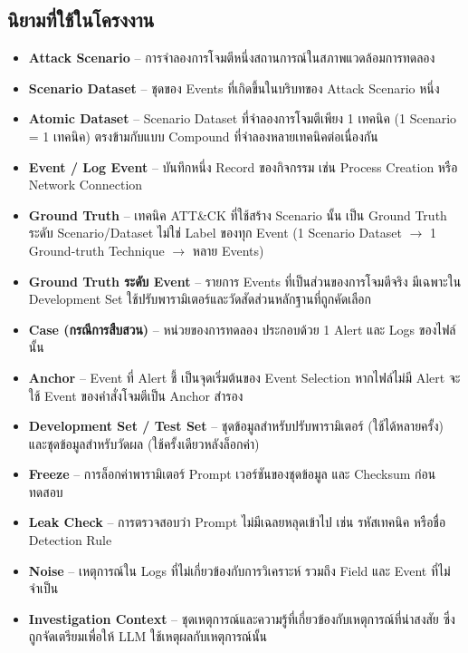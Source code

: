\subsection{นิยามที่ใช้ในโครงงาน}
\label{sec:scenario-def}
\begin{itemize}
  \item \textbf{Attack Scenario} -- การจำลองการโจมตีหนึ่งสถานการณ์ในสภาพแวดล้อมการทดลอง
  \item \textbf{Scenario Dataset} -- ชุดของ Events ที่เกิดขึ้นในบริบทของ Attack Scenario หนึ่ง
  \item \textbf{Atomic Dataset} -- Scenario Dataset ที่จำลองการโจมตีเพียง 1 เทคนิค
      (1 Scenario = 1 เทคนิค) ตรงข้ามกับแบบ Compound ที่จำลองหลายเทคนิคต่อเนื่องกัน
  \item \textbf{Event / Log Event} -- บันทึกหนึ่ง Record ของกิจกรรม เช่น Process Creation หรือ Network Connection
  \item \textbf{Ground Truth} -- เทคนิค ATT\&CK ที่ใช้สร้าง Scenario นั้น
        เป็น Ground Truth ระดับ Scenario/Dataset ไม่ใช่ Label ของทุก Event
        (1 Scenario Dataset $\rightarrow$ 1 Ground-truth Technique $\rightarrow$ หลาย Events)
  \item \textbf{Ground Truth ระดับ Event} -- รายการ Events ที่เป็นส่วนของการโจมตีจริง
        มีเฉพาะใน Development Set ใช้ปรับพารามิเตอร์และวัดสัดส่วนหลักฐานที่ถูกคัดเลือก
  \item \textbf{Case (กรณีการสืบสวน)} -- หน่วยของการทดลอง ประกอบด้วย 1 Alert และ Logs ของไฟล์นั้น
  \item \textbf{Anchor} -- Event ที่ Alert ชี้ เป็นจุดเริ่มต้นของ Event Selection
        หากไฟล์ไม่มี Alert จะใช้ Event ของคำสั่งโจมตีเป็น Anchor สำรอง
  \item \textbf{Development Set / Test Set} -- ชุดข้อมูลสำหรับปรับพารามิเตอร์ (ใช้ได้หลายครั้ง)
        และชุดข้อมูลสำหรับวัดผล (ใช้ครั้งเดียวหลังล็อกค่า)
  \item \textbf{Freeze} -- การล็อกค่าพารามิเตอร์ Prompt เวอร์ชันของชุดข้อมูล และ Checksum ก่อนทดสอบ
  \item \textbf{Leak Check} -- การตรวจสอบว่า Prompt ไม่มีเฉลยหลุดเข้าไป เช่น รหัสเทคนิค หรือชื่อ Detection Rule
  \item \textbf{Noise} -- เหตุการณ์ใน Logs ที่ไม่เกี่ยวข้องกับการวิเคราะห์ รวมถึง Field และ Event ที่ไม่จำเป็น
  \item \textbf{Investigation Context} -- ชุดเหตุการณ์และความรู้ที่เกี่ยวข้องกับเหตุการณ์ที่น่าสงสัย
        ซึ่งถูกจัดเตรียมเพื่อให้ LLM ใช้เหตุผลกับเหตุการณ์นั้น
\end{itemize}

